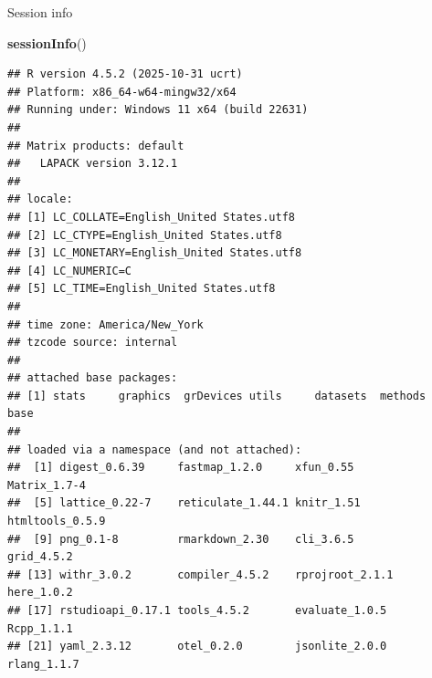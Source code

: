 \documentclass[
  ignorenonframetext,
  aspectratio=169]{beamer}
\newenvironment{Shaded}{\begin{snugshade}}{\end{snugshade}}
\newcommand{\FunctionTok}[1]{\textcolor[rgb]{0.13,0.29,0.53}{\textbf{#1}}}
\newcommand{\NormalTok}[1]{#1}
\begin{document}
\begin{frame}[fragile]{Session info}
\label{session-info}
\tiny

\begin{Shaded}
\begin{Highlighting}[]
\FunctionTok{sessionInfo}\NormalTok{()}
\end{Highlighting}
\end{Shaded}

\begin{verbatim}
## R version 4.5.2 (2025-10-31 ucrt)
## Platform: x86_64-w64-mingw32/x64
## Running under: Windows 11 x64 (build 22631)
## 
## Matrix products: default
##   LAPACK version 3.12.1
## 
## locale:
## [1] LC_COLLATE=English_United States.utf8 
## [2] LC_CTYPE=English_United States.utf8   
## [3] LC_MONETARY=English_United States.utf8
## [4] LC_NUMERIC=C                          
## [5] LC_TIME=English_United States.utf8    
## 
## time zone: America/New_York
## tzcode source: internal
## 
## attached base packages:
## [1] stats     graphics  grDevices utils     datasets  methods   base     
## 
## loaded via a namespace (and not attached):
##  [1] digest_0.6.39     fastmap_1.2.0     xfun_0.55         Matrix_1.7-4     
##  [5] lattice_0.22-7    reticulate_1.44.1 knitr_1.51        htmltools_0.5.9  
##  [9] png_0.1-8         rmarkdown_2.30    cli_3.6.5         grid_4.5.2       
## [13] withr_3.0.2       compiler_4.5.2    rprojroot_2.1.1   here_1.0.2       
## [17] rstudioapi_0.17.1 tools_4.5.2       evaluate_1.0.5    Rcpp_1.1.1       
## [21] yaml_2.3.12       otel_0.2.0        jsonlite_2.0.0    rlang_1.1.7
\end{verbatim}
\end{frame}
\end{document}
